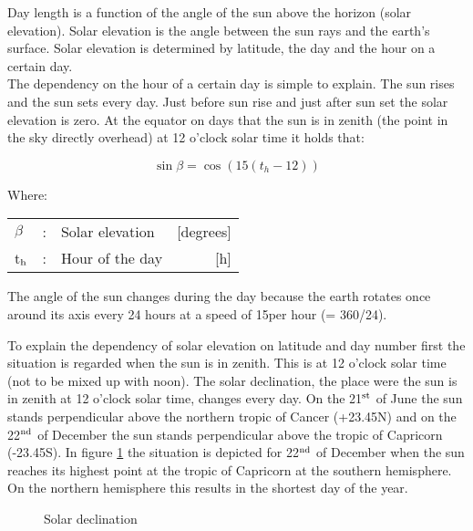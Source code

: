 \documentclass[11pt]{report}
\newcommand{\FigDir}{.}
\begin{document}
Day length is a function of the angle of the sun above the horizon (solar elevation). Solar
elevation is the angle between the sun rays and the earth's surface. Solar elevation is
determined by latitude, the day and the hour on a certain day. \\
The dependency on the hour of a certain day is simple to explain. The sun rises and the
sun sets every day. Just before sun rise and just after sun set the solar elevation is zero. At the equator on days that the sun is in zenith (the point in the sky directly overhead) at 12 o'clock solar time it holds that:

\begin{equation}
\sin \beta = \cos (15(t _{h} -12))
\end{equation}

Where:\\
\begin{tabularx}{\textwidth}{llXr}
$\beta$ &:& Solar elevation  & [degrees]\\
t$_{{\rm h}}$ &:& Hour of the day  & [h]\\
\end{tabularx}

The angle of the sun changes during the day because the earth rotates once around its axis
every 24 hours at a speed of 15\degrees  per hour (= 360/24).  

To explain the dependency of solar elevation on latitude and day number first the situation
is regarded when the sun is in zenith. This is at 12 o'clock solar time (not to be mixed up
with noon). The solar declination, the place were the sun is in zenith at 12 o'clock solar
time, changes every day. On the 21$^{\rm st}$ of June the sun stands perpen\-dicular above the northern tropic of Cancer (+23.45\degrees N) and on the 22$^{\rm nd}$ of December the sun stands perpendicular above the tropic of Capricorn (-23.45\degrees S). In figure \ref{fig:solardecl} the situation is depicted for 22$^{\rm nd}$ of December when the sun reaches its highest point at the tropic of Capricorn at the southern hemisphere. On the northern hemisphere this results in the shortest day of the year. \\

\begin{figure}[htbp]
\caption{Solar declination}
\label{fig:solardecl}
\begin{forcewidth}{9.33cm}
 \begin{center}\InputPS{\FigDir/AARDE3.eps} \end{center}
\end{forcewidth}
\end{figure}
\end{document}
